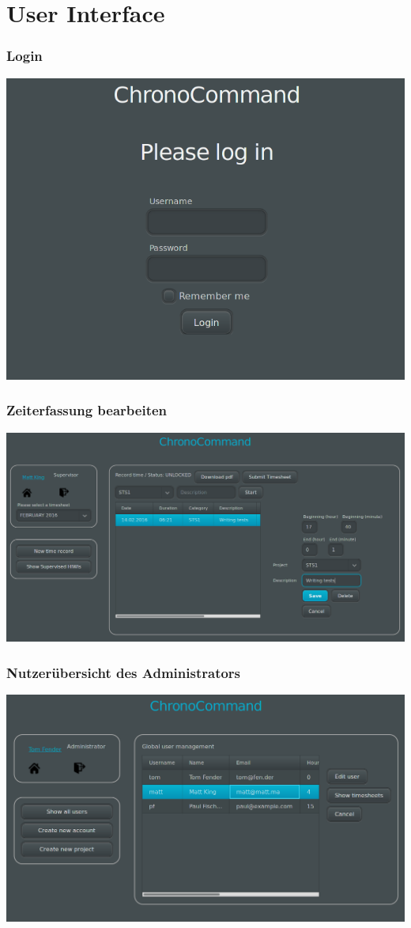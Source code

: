 




\section{User Interface}
\begin{frame}
	\frametitle{Login}
	\includegraphics{images/login.png}
\end{frame}

\begin{frame}
	\frametitle{Zeiterfassung bearbeiten}
	\includegraphics{images/timerecord-edit.png}
\end{frame}

\begin{frame}
	\frametitle{Nutzerübersicht des Administrators}
	\includegraphics{images/admin-overview.png}
\end{frame}

